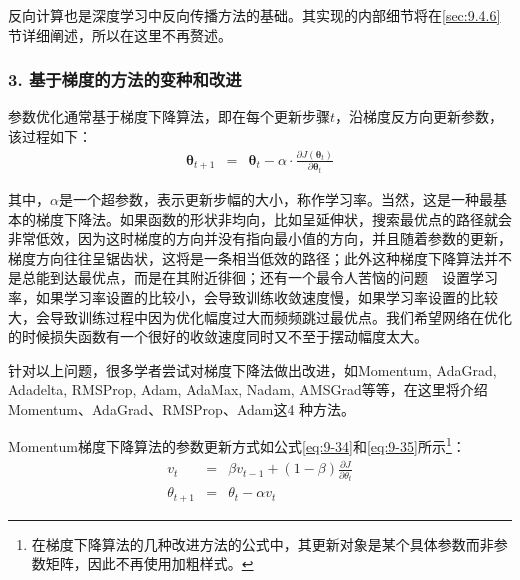 \parinterval  反向计算也是深度学习中反向传播方法的基础。其实现的内部细节将在\ref{sec:9.4.6}节详细阐述，所以在这里不再赘述。


\subsubsection{3. 基于梯度的方法的变种和改进}\label{sec:9.4.2.3}

\parinterval  参数优化通常基于梯度下降算法，即在每个更新步骤$ t $，沿梯度反方向更新参数，该过程如下：
\begin{eqnarray}
{\bm \theta}_{t+1}&=&{\bm \theta}_{t}-\alpha \cdot \frac{\partial J({\bm \theta}_t)}{\partial {\bm \theta}_t}
\label{eq:9-200}
\end{eqnarray}

\noindent 其中，$ \alpha $是一个超参数，表示更新步幅的大小，称作学习率。当然，这是一种最基本的梯度下降法。如果函数的形状非均向，比如呈延伸状，搜索最优点的路径就会非常低效，因为这时梯度的方向并没有指向最小值的方向，并且随着参数的更新，梯度方向往往呈锯齿状，这将是一条相当低效的路径；此外这种梯度下降算法并不是总能到达最优点，而是在其附近徘徊；还有一个最令人苦恼的问题\ \dash \ 设置学习率，如果学习率设置的比较小，会导致训练收敛速度慢，如果学习率设置的比较大，会导致训练过程中因为优化幅度过大而频频跳过最优点。我们希望网络在优化的时候损失函数有一个很好的收敛速度同时又不至于摆动幅度太大。

\parinterval  针对以上问题，很多学者尝试对梯度下降法做出改进，如Momentum, AdaGrad, Adadelta, RMSProp, Adam, AdaMax, Nadam, AMSGrad等等，在这里将介绍Momentum、AdaGrad、RMSProp、Adam这4 种方法。

%

\vspace{0.5em}
\vspace{0.5em}

\parinterval  Momentum梯度下降算法的参数更新方式如公式\eqref{eq:9-34}和\eqref{eq:9-35}所示\footnote{在梯度下降算法的几种改进方法的公式中，其更新对象是某个具体参数而非参数矩阵，因此不再使用加粗样式。}：
\begin{eqnarray}
v_t&=&\beta v_{t-1}+(1-\beta)\frac{\partial J}{\partial \theta_t}
\label{eq:9-34}\\
\theta_{t+1}&=&\theta_t-\alpha v_t
\label{eq:9-35}
\end{eqnarray}

